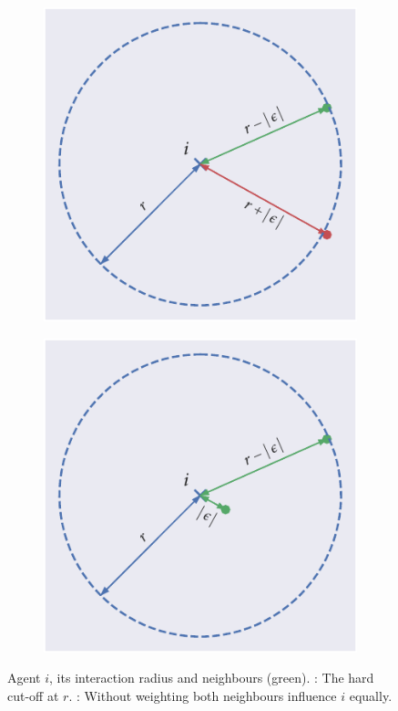 \begin{figure}[!tbp]
	\begin{subfigure}[b]{0.45\textwidth}
		\includegraphics{no_interact.pdf}
		\caption{}
		\label{subfig:no_interact}
	\end{subfigure}%
	\hspace{0.05\textwidth}
	\begin{subfigure}[b]{0.45\textwidth}
		\includegraphics{interact.pdf}
		\caption{}
		\label{subfig:interact}
	\end{subfigure}
	\caption{Agent $i$, its interaction radius and neighbours (green). : The 
hard cut-off at $r$. : Without weighting both neighbours influence $i$ 
equally.}
\end{figure}

